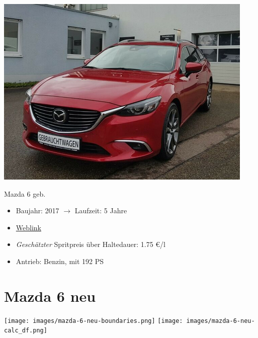 \documentclass[landscape, DIV=99, 14pt]{scrartcl}
\begin{document}
\pagebreak
\null
\vspace{2cm}
\begin{center}
\includegraphics[width=0.9\columnwidth]{cars/mazda-6-alt.png}

Mazda 6 geb.
\end{center}

\begin{itemize}
    \item Baujahr: 2017 $\rightarrow$ Laufzeit: 5 Jahre
    \item \href{https://suchen.mobile.de/fahrzeuge/details.html?action=parkItem&id=332186075}{Weblink}
    \item \emph{Gesch\"atzter} Spritpreis \"uber Haltedauer: 1.75 \euro{}/l
    \item Antrieb: Benzin, mit 192 PS
\end{itemize}

\pagebreak


\twocolumn

\section*{Mazda 6 neu}
\begin{center}
\texttt{[image: images/mazda-6-neu-boundaries.png]}
\null
\vspace{0.5cm}
\texttt{[image: images/mazda-6-neu-calc\_df.png]}
\end{center}
\end{document}
